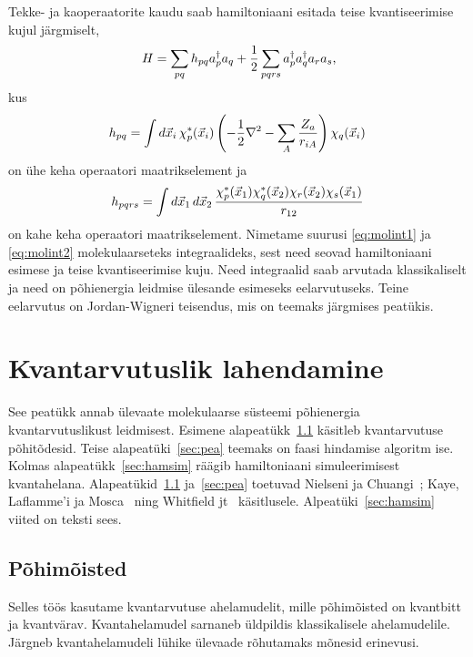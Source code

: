 \documentclass[12pt]{report}
\def\paren#1{\left(#1\right)}
\def\d#1{\mathinner{d#1}}
\begin{document}
Tekke- ja kaoperaatorite kaudu saab hamiltoniaani esitada teise kvantiseerimise kujul järgmiselt,
\begin{align}
    H = \sum_{pq}h_{pq}a_p^\dagger a_q
    + \frac{1}{2} \sum_{pqrs} a_p^\dagger a_q^\dagger a_r a_s \rlap{,}
\end{align}
kus
\begin{align}\label{eq:molint1}
    h_{pq} = \int\d{\vec{x}_i} \chi_p^*(\vec{x}_i)
    \paren{-\frac{1}{2} \nabla^2 - \sum_A \frac{Z_a}{r_{iA}}} \chi_q(\vec{x}_i)
\end{align}
on ühe keha operaatori maatrikselement ja
\begin{align}\label{eq:molint2}
    h_{pqrs} = \int \d{\vec{x}_1} \d{\vec{x}_2}
    \frac{\chi_p^*(\vec{x}_1) \chi_q^*(\vec{x}_2) \chi_r(\vec{x}_2) \chi_s(\vec{x}_1)}{r_{12}}
\end{align}
on kahe keha operaatori maatrikselement.
Nimetame suurusi \eqref{eq:molint1} ja \eqref{eq:molint2} molekulaarseteks integraalideks, sest need seovad hamiltoniaani esimese ja teise kvantiseerimise kuju.
Need integraalid saab arvutada klassikaliselt ja need on põhienergia leidmise ülesande esimeseks eelarvutuseks. Teine eelarvutus on Jordan-Wigneri teisendus, mis on teemaks järgmises peatükis.

\chapter{Kvantarvutuslik lahendamine}\label{chap:qcomp}

See peatükk annab ülevaate molekulaarse süsteemi põhienergia kvantarvutuslikust leidmisest.
Esimene alapeatükk~\ref{sec:terms} käsitleb kvantarvutuse põhitõdesid.
Teise alapeatüki~\ref{sec:pea} teemaks on faasi hindamise algoritm ise.
Kolmas alapeatükk~\ref{sec:hamsim} räägib hamiltoniaani simuleerimisest kvantahelana.
Alapeatükid~\ref{sec:terms} ja~\ref{sec:pea} toetuvad Nielseni ja Chuangi~\cite{nielsen+chuang}; Kaye, Laflamme'i ja Mosca~\cite{kaye+laflamme+mosca} ning Whitfield jt~\cite{whitfield+etal2011} käsitlusele.
Alpeatüki~\ref{sec:hamsim} viited on teksti sees.

\section{Põhimõisted}\label{sec:terms}

Selles töös kasutame kvantarvutuse ahelamudelit, mille põhimõisted on kvantbitt ja kvantvärav.
Kvantahelamudel sarnaneb üldpildis klassikalisele ahelamudelile.
Järgneb kvantahelamudeli lühike ülevaade rõhutamaks mõnesid erinevusi.
\end{document}
